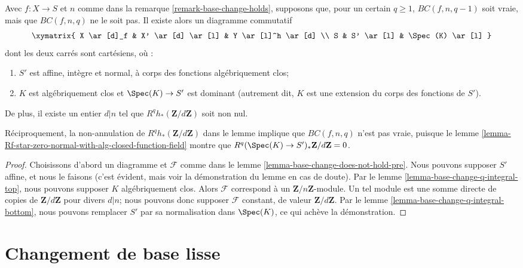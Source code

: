 \begin{lemma}
\label{lemma-base-change-does-not-hold}
Avec $f : X \to S$ et $n$ comme dans la remarque \ref{remark-base-change-holds},
supposons que, pour un certain $q \geq 1$,
$BC(f, n, q - 1)$ soit vraie, mais que $BC(f, n, q)$ ne le soit pas.
Il existe alors un diagramme commutatif
$$
\xymatrix{
X \ar[d]_f & X' \ar[d] \ar[l] & Y \ar[l]^h \ar[d] \\
S & S' \ar[l] & \Spec(K) \ar[l]
}
$$
dont les deux carrés sont cartésiens, où :
\begin{enumerate}
\item $S'$ est affine, intègre et normal, à corps des fonctions
algébriquement clos;
\item $K$ est algébriquement clos et $\Spec(K) \to S'$
est dominant (autrement dit, $K$ est une extension du
corps des fonctions de $S'$).
\end{enumerate}
De plus, il existe un entier $d | n$
tel que $R^qh_*(\mathbf{Z}/d\mathbf{Z})$ soit non nul.
\end{lemma}

\noindent
Réciproquement, la non-annulation de $R^qh_*(\mathbf{Z}/d\mathbf{Z})$
dans le lemme implique que $BC(f, n, q)$ n'est pas vraie, puisque le
lemme \ref{lemma-Rf-star-zero-normal-with-alg-closed-function-field}
montre que $R^q(\Spec(K) \to S')_*\mathbf{Z}/d\mathbf{Z} = 0$.

\begin{proof}
Choisissons d'abord un diagramme et $\mathcal{F}$ comme dans le
lemme \ref{lemma-base-change-does-not-hold-pre}.
Nous pouvons supposer $S'$ affine, et nous le faisons (c'est évident, mais
voir la démonstration du lemme en cas de doute).
Par le lemme \ref{lemma-base-change-q-integral-top},
nous pouvons supposer $K$ algébriquement clos.
Alors $\mathcal{F}$ correspond à un $\mathbf{Z}/n\mathbf{Z}$-module.
Un tel module est une somme directe de copies de $\mathbf{Z}/d\mathbf{Z}$
pour divers $d | n$; nous pouvons donc supposer $\mathcal{F}$
constant, de valeur $\mathbf{Z}/d\mathbf{Z}$.
Par le lemme \ref{lemma-base-change-q-integral-bottom},
nous pouvons remplacer $S'$ par sa normalisation
dans $\Spec(K)$, ce qui achève la démonstration.
\end{proof}










\section{Changement de base lisse}
\label{section-smooth-base-change}

